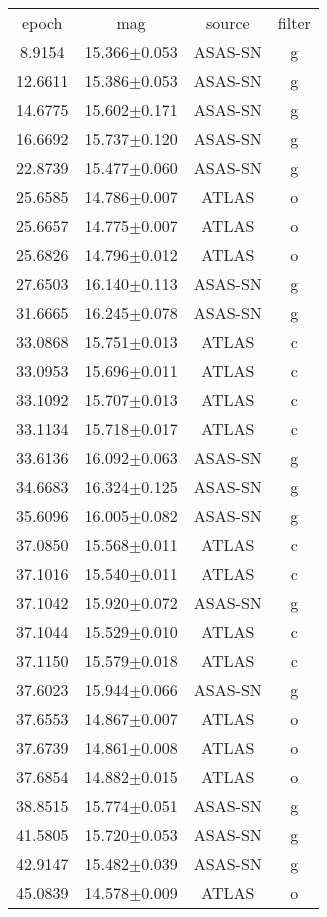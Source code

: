 \begin{table}
\begin{tabular}{cccc}
epoch & mag & source & filter \\
8.9154 & 15.366$\pm$0.053 & ASAS-SN & g \\
12.6611 & 15.386$\pm$0.053 & ASAS-SN & g \\
14.6775 & 15.602$\pm$0.171 & ASAS-SN & g \\
16.6692 & 15.737$\pm$0.120 & ASAS-SN & g \\
22.8739 & 15.477$\pm$0.060 & ASAS-SN & g \\
25.6585 & 14.786$\pm$0.007 & ATLAS & o \\
25.6657 & 14.775$\pm$0.007 & ATLAS & o \\
25.6826 & 14.796$\pm$0.012 & ATLAS & o \\
27.6503 & 16.140$\pm$0.113 & ASAS-SN & g \\
31.6665 & 16.245$\pm$0.078 & ASAS-SN & g \\
33.0868 & 15.751$\pm$0.013 & ATLAS & c \\
33.0953 & 15.696$\pm$0.011 & ATLAS & c \\
33.1092 & 15.707$\pm$0.013 & ATLAS & c \\
33.1134 & 15.718$\pm$0.017 & ATLAS & c \\
33.6136 & 16.092$\pm$0.063 & ASAS-SN & g \\
34.6683 & 16.324$\pm$0.125 & ASAS-SN & g \\
35.6096 & 16.005$\pm$0.082 & ASAS-SN & g \\
37.0850 & 15.568$\pm$0.011 & ATLAS & c \\
37.1016 & 15.540$\pm$0.011 & ATLAS & c \\
37.1042 & 15.920$\pm$0.072 & ASAS-SN & g \\
37.1044 & 15.529$\pm$0.010 & ATLAS & c \\
37.1150 & 15.579$\pm$0.018 & ATLAS & c \\
37.6023 & 15.944$\pm$0.066 & ASAS-SN & g \\
37.6553 & 14.867$\pm$0.007 & ATLAS & o \\
37.6739 & 14.861$\pm$0.008 & ATLAS & o \\
37.6854 & 14.882$\pm$0.015 & ATLAS & o \\
38.8515 & 15.774$\pm$0.051 & ASAS-SN & g \\
41.5805 & 15.720$\pm$0.053 & ASAS-SN & g \\
42.9147 & 15.482$\pm$0.039 & ASAS-SN & g \\
45.0839 & 14.578$\pm$0.009 & ATLAS & o \\

\end{tabular}
\end{table}

